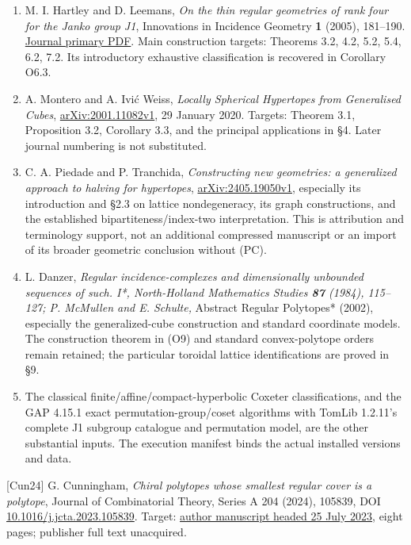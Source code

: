 \documentclass[
  10pt,
  letterpaper,
]{article}
\providecommand{\tightlist}{%
  \setlength{\itemsep}{0pt}\setlength{\parskip}{0pt}}
\begin{document}
\begin{enumerate}
\def\labelenumi{\arabic{enumi}.}
\tightlist
\item
  M. I. Hartley and D. Leemans, \emph{On the thin regular geometries of
  rank four for the Janko group J1}, Innovations in Incidence Geometry
  \textbf{1} (2005), 181--190.
  \href{https://msp.org/iig/2005/1-1/iig-v1-n1-p08-s.pdf}{Journal
  primary PDF}. Main construction targets: Theorems 3.2, 4.2, 5.2, 5.4,
  6.2, 7.2. Its introductory exhaustive classification is recovered in
  Corollary O6.3.
\item
  A. Montero and A. Ivić Weiss, \emph{Locally Spherical Hypertopes from
  Generalised Cubes},
  \href{https://arxiv.org/abs/2001.11082v1}{arXiv:2001.11082v1}, 29
  January 2020. Targets: Theorem 3.1, Proposition 3.2, Corollary 3.3,
  and the principal applications in §4. Later journal numbering is not
  substituted.
\item
  C. A. Piedade and P. Tranchida, \emph{Constructing new geometries: a
  generalized approach to halving for hypertopes},
  \href{https://arxiv.org/abs/2405.19050v1}{arXiv:2405.19050v1},
  especially its introduction and §2.3 on lattice nondegeneracy, its
  graph constructions, and the established bipartiteness/index-two
  interpretation. This is attribution and terminology support, not an
  additional compressed manuscript or an import of its broader geometric
  conclusion without (PC).
\item
  L. Danzer, \emph{Regular incidence-complexes and dimensionally
  unbounded sequences of such. I*, North-Holland Mathematics Studies
  \textbf{87} (1984), 115--127; P. McMullen and E. Schulte, }Abstract
  Regular Polytopes* (2002), especially the generalized-cube
  construction and standard coordinate models. The construction theorem
  in (O9) and standard convex-polytope orders remain retained; the
  particular toroidal lattice identifications are proved in §9.
\item
  The classical finite/affine/compact-hyperbolic Coxeter
  classifications, and the GAP 4.15.1 exact permutation-group/coset
  algorithms with TomLib 1.2.11's complete J1 subgroup catalogue and
  permutation model, are the other substantial inputs. The execution
  manifest binds the actual installed versions and data.
\end{enumerate}

{[}Cun24{]} G. Cunningham, \emph{Chiral polytopes whose smallest regular
cover is a polytope}, Journal of Combinatorial Theory, Series A 204
(2024), 105839, DOI
\href{https://doi.org/10.1016/j.jcta.2023.105839}{10.1016/j.jcta.2023.105839}.
Target:
\href{https://gabrielcunningham.com/WhichChiralPolytopes.pdf}{author
manuscript headed 25 July 2023}, eight pages; publisher full text
unacquired.
\end{document}
